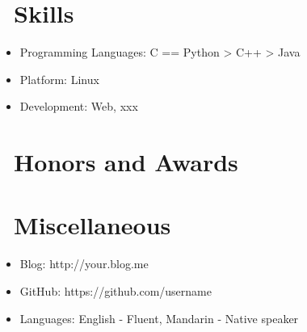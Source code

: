 \documentclass{resume}
\begin{document}
\section{\faCogs\ Skills}
\begin{itemize}[parsep=0.5ex]
  \item Programming Languages: C == Python > C++ > Java
  \item Platform: Linux
  \item Development: Web, xxx
\end{itemize}

\section{\faHeartO\ Honors and Awards}

\section{\faInfo\ Miscellaneous}
\begin{itemize}[parsep=0.5ex]
  \item Blog: http://your.blog.me
  \item GitHub: https://github.com/username
  \item Languages: English - Fluent, Mandarin - Native speaker
\end{itemize}

%
%
\end{document}
